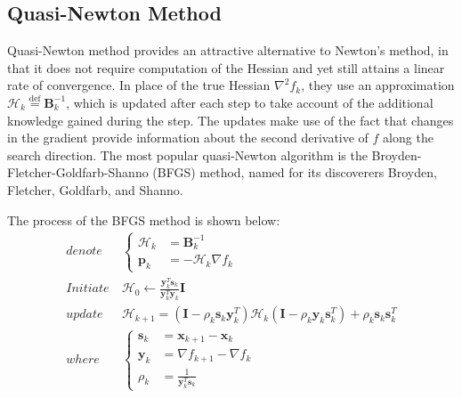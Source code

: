 \subsection{Quasi-Newton Method}\label{sec:BFGS}
Quasi-Newton method provides an attractive alternative to Newton's method, in that it does not require computation of the Hessian and yet still attains a linear rate of convergence. In place of the true Hessian $\nabla^2 f_k$, they use an approximation $\mathcal{H}_k \stackrel{\text{def}}{=} \textbf{B}_k^{-1}$, which is updated after each step to take account of the additional knowledge gained during the step. The updates make use of the fact that changes in the gradient provide information about the second derivative of $f$ along the search direction. The most popular quasi-Newton algorithm is the Broyden-Fletcher-Goldfarb-Shanno (BFGS) method, named for its discoverers Broyden, Fletcher, Goldfarb, and Shanno. \cite{Nocedal2006}

The process of the BFGS method is shown below:
\begin{align}
  denote   & \                       \left\{
  \begin{array}{ll}
    \mathcal{H}_k & = \textbf{B}_k^{-1}          \\
    \textbf{p}_k & = -\mathcal{H}_k \nabla f_{k}
  \end{array}
  \right.                                                                                                                                                                                                        \\
  Initiate & \ \mathcal{H}_0     \leftarrow \frac{\textbf{y}_k^T\textbf{s}_k}{\textbf{y}_k^T\textbf{y}_k}\textbf{I}                                                           \label{eq:BFGS_initiate_H_0}        \\
  update   & \ \mathcal{H}_{k+1}  = (\textbf{I} - \rho_k\textbf{s}_k\textbf{y}_k^T) \mathcal{H}_{k} (\textbf{I} - \rho_k\textbf{y}_k\textbf{s}_k^T) +\rho_k\textbf{s}_k\textbf{s}_k^T \label{eq:BFGS_update_H_k+1} \\
  where    & \                        \left\{
  \begin{array}{ll}
    \textbf{s}_k & = \textbf{x}_{k+1} - \textbf{x}_{k}                               \\
    \textbf{y}_k & = \nabla f_{k+1} - \nabla f_{k}                                   \\
    \rho_k       & = \frac{1}{\textbf{y}_k^T\textbf{s}_k} \label{eq:BFGS_calc_rho_k}
  \end{array}
  \right.
\end{align}

